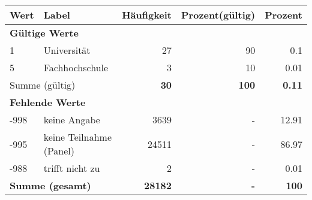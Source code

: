      \begin{longtable}{lXrrr}
     \toprule
     \textbf{Wert} & \textbf{Label} & \textbf{Häufigkeit} & \textbf{Prozent(gültig)} & \textbf{Prozent} \\
     \endhead
     \midrule
     \multicolumn{5}{l}{\textbf{Gültige Werte}}\\

     1 &
     \multicolumn{1}{X}{ Universität   } &


       \num{27} &
       \num[round-mode=places,round-precision=2]{90} &
         \num[round-mode=places,round-precision=2]{0.1} \\

     5 &
     \multicolumn{1}{X}{ Fachhochschule   } &


       \num{3} &
       \num[round-mode=places,round-precision=2]{10} &
         \num[round-mode=places,round-precision=2]{0.01} \\
     \midrule
     \multicolumn{2}{l}{Summe (gültig)} &
       \textbf{\num{30}} &
     \textbf{\num{100}} &
       \textbf{\num[round-mode=places,round-precision=2]{0.11}} \\
     \multicolumn{5}{l}{\textbf{Fehlende Werte}}\\
       -998 &
       keine Angabe &
         \num{3639} &
        - &
         \num[round-mode=places,round-precision=2]{12.91} \\
       -995 &
       keine Teilnahme (Panel) &
         \num{24511} &
        - &
         \num[round-mode=places,round-precision=2]{86.97} \\
       -988 &
       trifft nicht zu &
         \num{2} &
        - &
         \num[round-mode=places,round-precision=2]{0.01} \\
     \midrule
     \multicolumn{2}{l}{\textbf{Summe (gesamt)}} &
          \textbf{\num{28182}} &
        \textbf{-} &
        \textbf{\num{100}} \\
     \bottomrule
     \end{longtable}
     
